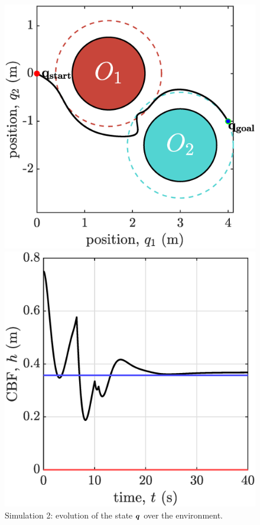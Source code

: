 \clearpage
\begin{figure}[!ht]
    \begin{minipage}[b]{0.46\linewidth}
    \includegraphics[width=\textwidth]{figures/sim2map.eps}
    \caption{\label{fig:sim2map}Simulation 2: evolution of the state ${\boldsymbol{q}}$ over the environment.}
    \end{minipage}
    \hfill
    \begin{minipage}[b]{0.46\linewidth}
    \includegraphics[width=\textwidth]{figures/sim2h.eps}

\end{minipage}
\end{figure}
